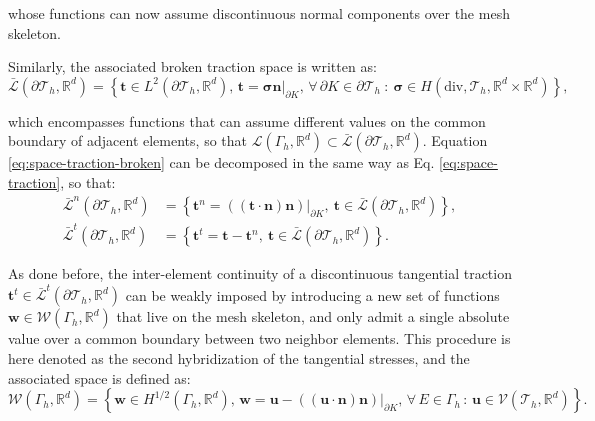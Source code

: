 \documentclass[english,11pt,3p,number,sort&compress]{elsarticle}
\begin{document}
\noindent whose functions can now assume discontinuous normal components over the mesh skeleton.

Similarly, the associated broken traction space is written as:
\begin{equation}
	\label{eq:space-traction-broken}
	\bar{\mathcal{L}}(\partial\mathcal{T}_h,\mathbb{R}^d) = \left\{\bm{t} \in L^2(\partial\mathcal{T}_h,\mathbb{R}^d), \, \bm{t}=\bm{\sigma}\bm{n}\lvert_{\partial K}, \, \forall \, \partial K \in \partial\mathcal{T}_h ~:~\bm{\sigma} \in H(\text{div},\mathcal{T}_h,\mathbb{R}^d \times \mathbb{R}^d) \right\},
\end{equation}

\noindent which encompasses functions that can assume different values on the common boundary of adjacent elements, so that $\mathcal{L}(\Gamma_h,\mathbb{R}^d) \subset \bar{\mathcal{L}}(\partial\mathcal{T}_h,\mathbb{R}^d)$. Equation \eqref{eq:space-traction-broken} can be decomposed in the same way as Eq. \eqref{eq:space-traction}, so that:
\begin{subequations}
	\begin{align}
		\bar{\mathcal{L}}^n(\partial\mathcal{T}_h,\mathbb{R}^d) &= \left\{\bm{t}^n=((\bm{t}\cdot\bm{n})\bm{n})\lvert_{\partial K}, ~\bm{t} \in \bar{\mathcal{L}}(\partial\mathcal{T}_h,\mathbb{R}^d) \right\} , \label{eq:space-traction-broken-normal}\\
		\bar{\mathcal{L}}^t(\partial\mathcal{T}_h,\mathbb{R}^d) &= \left\{\bm{t}^t=\bm{t}-\bm{t}^n, ~\bm{t} \in \bar{\mathcal{L}}(\partial\mathcal{T}_h,\mathbb{R}^d) \right\} . \label{eq:space-traction-broken-tangential}
	\end{align}
\end{subequations}

As done before, the inter-element continuity of a discontinuous tangential traction $\bm{t}^t \in \bar{\mathcal{L}}^t(\partial\mathcal{T}_h,\mathbb{R}^d)$ can be weakly imposed by introducing a new set of functions $\bm{w} \in \mathcal{W}(\Gamma_h,\mathbb{R}^d)$ that live on the mesh skeleton, and only admit a single absolute value over a common boundary between two neighbor elements. This procedure is here denoted as the second hybridization of the tangential stresses, and the associated space is defined as:
\begin{equation}
	\label{eq:space-tangential-vel}
	\mathcal{W}(\Gamma_h,\mathbb{R}^d) = \left\{\bm{w} \in H^{1/2}(\Gamma_h,\mathbb{R}^d), \, \bm{w}=\bm{u}-((\bm{u}\cdot\bm{n})\bm{n})\lvert_{\partial K}, \, \forall \, E \in \Gamma_h \,:\, \bm{u} \in \mathcal{V}(\mathcal{T}_h,\mathbb{R}^d) \right\}.
\end{equation}
\end{document}
